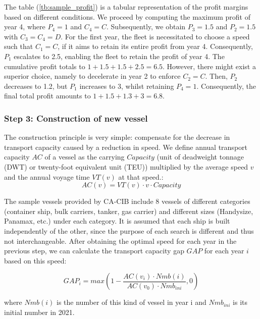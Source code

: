 \documentclass[a4paper,12pt]{article}
\begin{document}
The table (\ref{tb:sample_profit}) is a tabular representation of the profit margins based on different conditions.
We proceed by computing the maximum profit of year 4, where $P_4 = 1$ and $C_4 = C$. Subsequently, we obtain $P_3 = 1.5$ and $P_2 = 1.5$ with $C_3 = C_4 = D$. For the first year, the fleet is necessitated to choose a speed such that $C_1 = C$, if it aims to retain its entire profit from year 4. Consequently, $P_1$ escalates to 2.5, enabling the fleet to retain the profit of year 4. The cumulative profit totals to $1+1.5+1.5+2.5 = 6.5$. However, there might exist a superior choice, namely to decelerate in year 2 to enforce $C_2 = C$. Then, $P_2$ decreases to 1.2, but $P_1$ increases to 3, whilst retaining $P_4 = 1$. Consequently, the final total profit amounts to $1 + 1.5 + 1.3 + 3 = 6.8$.


\subsubsection*{Step 3: Construction of new vessel}
The construction principle is very simple: compensate for the decrease in transport capacity caused by a reduction in speed.
We define annual transport capacity $AC$ of a vessel as the carrying $Capacity$ (unit of deadweight tonnage (DWT) or twenty-foot equivalent unit (TEU)) multiplied by the average speed $v$ and the annual voyage time $VT(v)$ at that speed.:
\begin{equation}
	\label{eq:AC}
	AC(v) = VT(v)  \cdot v \cdot Capacity
\end{equation}

The sample vessels provided by CA-CIB include 8 vessels of different categories (container ship, bulk carriers, tanker, gas carrier) and different sizes (Handysize, Panamax, etc.) under each category.
It is assumed that each ship is built independently of the other, since the purpose of each search is different and thus not interchangeable.
After obtaining the optimal speed for each year in the previous step, we can calculate the transport capacity gap $GAP$ for each year $i$ based on this speed:

\begin{equation}
	\label{eq:gap}
	GAP_{i} = max(1 - \frac{AC(v_i) \cdot Nmb(i)}{AC(v_0) \cdot Nmb_{ini}}, 0) 
\end{equation}

where $Nmb(i)$ is the number of this kind of vessel in year i and $Nmb_{ini}$ is its initial number in 2021.\\
\end{document}
